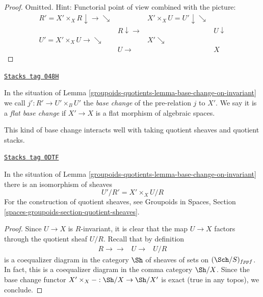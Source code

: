 \begin{proof}
Omitted. Hint: Functorial point of view combined with the picture:
$$
\begin{array}{cccc}R' = X' \times_X R \downarrow\longrightarrow\searrow &  & X' \times_X U = U' \downarrow\searrow &  \\  & R \downarrow\longrightarrow &  & U \downarrow \\ U' = X' \times_X U \longrightarrow\searrow &  & X' \searrow &  \\  & U \longrightarrow &  & X\end{array}
$$
\end{proof}

\begin{definition}
\label{groupoids-quotients-definition-base-change}
\href{https://stacks.math.columbia.edu/tag/048H}{\texttt{Stacks tag 048H}}

In the situation of Lemma \ref{groupoids-quotients-lemma-base-change-on-invariant}
we call $j' : R' \to U' \times_B U'$ the {\it base change} of the pre-relation
$j$ to $X'$. We say it is a {\it flat base change} if $X' \to X$ is a flat
morphism of algebraic spaces.
\end{definition}

This kind of base change interacts well with taking quotient sheaves
and quotient stacks.

\begin{lemma}
\label{groupoids-quotients-lemma-base-change-quotient-sheaf}
\href{https://stacks.math.columbia.edu/tag/0DTF}{\texttt{Stacks tag 0DTF}}

In the situation of Lemma \ref{groupoids-quotients-lemma-base-change-on-invariant}
there is an isomorphism of sheaves
$$
U'/R' = X' \times_X U/R
$$
For the construction of quotient sheaves, see
Groupoids in Spaces, Section \ref{spaces-groupoids-section-quotient-sheaves}.
\end{lemma}

\begin{proof}
Since $U \to X$ is $R$-invariant, it is clear that the map
$U \to X$ factors through the quotient sheaf $U/R$.
Recall that by definition
$$
\begin{array}{ccc}R \longrightarrow\longrightarrow & U \longrightarrow & U/R\end{array}
$$
is a coequalizer diagram in the category $\Sh$ of sheaves of sets on
$(\Sch/S)_{fppf}$. In fact, this is a coequalizer diagram in the
comma category $\Sh/X$. Since the base change functor
$X' \times_X - : \Sh/X \to \Sh/X'$ is exact (true in any topos),
we conclude.
\end{proof}

